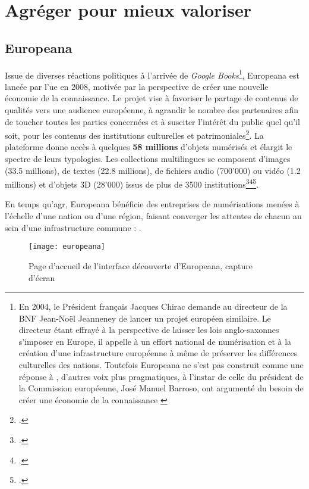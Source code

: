 \section{Agréger pour mieux valoriser}


\subsection{Europeana}

Issue de diverses réactions politiques à l'arrivée de \textit{Google Books}\footnote{En 2004, le Président français Jacques Chirac demande au directeur de la BNF Jean-Noël Jeanneney de lancer un projet européen similaire. Le directeur étant effrayé à la perspective de laisser les lois anglo-saxonnes s'imposer en Europe, il appelle à un effort national de numérisation et à la création d'une infrastructure européenne à même de préserver les différences culturelles des nations. Toutefois Europeana ne s'est pas construit comme une réponse à , d'autres voix plus pragmatiques, à l'instar de celle du président de la Commission européenne, José Manuel Barroso, ont argumenté du besoin de créer une économie de la connaissance \cite{thylstrup_politics_2018}}, Europeana est lancée par l'\gls{ue} en 2008, motivée par la perspective de créer une nouvelle économie de la connaissance. Le projet vise à favoriser le partage de contenus de qualités vers une audience européenne, à agrandir le nombre des partenaires afin de toucher toutes les parties concernées et à susciter l'intérêt du public quel qu'il soit, pour les contenus des institutions culturelles et patrimoniales\footcite{europeana_europeana_nodate-2}. La plateforme donne accès à quelques \textbf{58 millions} d'objets numérisés et élargit le spectre de leurs typologies. Les collections multilingues se composent d'images (33.5 millions), de textes (22.8 millions), de fichiers audio (700'000) ou vidéo (1.2 millions) et d'objets 3D (28'000) issus de plus de 3500 institutions\footcite{europeana_europeana_nodate-2}\footcite{xie_discover_2016}\footcite{noauthor_european_2019}.

En temps qu'\gls{agr}, Europeana bénéficie des entreprises de numérisations menées à l'échelle d'une nation ou d'une région, faisant converger les attentes de chacun au sein d'une infrastructure commune : .
\newpage
\begin{figure}[H]%
\centering
\texttt{[image: europeana]}
\caption{Page d'accueil de l'interface découverte d'Europeana, capture d'écran}
\end{figure}

